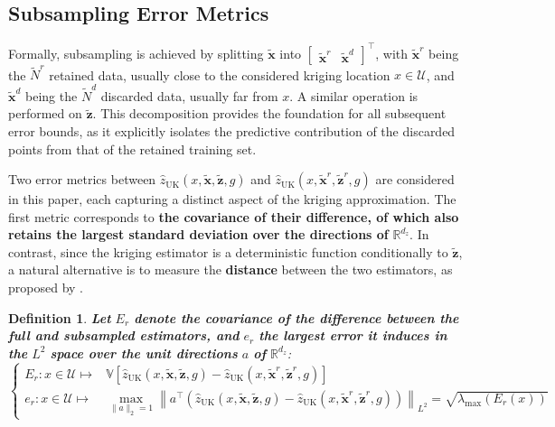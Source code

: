 \documentclass[preprint]{elsarticle}
\newtheorem{definition}{Definition}
\begin{document}
\subsection{Subsampling Error Metrics}\label{sec:subsampling_errors}

Formally, subsampling is achieved by splitting $\tilde{\mathbf{x}}$ into $\begin{bmatrix}\tilde{\mathbf{x}}^r&\tilde{\mathbf{x}}^d\end{bmatrix}^\top$, with $\tilde{\mathbf{x}}^r$ being the $\tilde{N}^r$ retained data, usually close to the considered kriging location $x\in\mathcal{U}$, and $\tilde{\mathbf{x}}^d$ being the $\tilde{N}^d$ discarded data, usually far from $x$. A similar operation is performed on $\tilde{\mathbf{z}}$. This decomposition provides the foundation for all subsequent error bounds, as it explicitly isolates the predictive contribution of the discarded points from that of the retained training set.

Two error metrics between $\hat{z}_{\mathrm{UK}}(x,\tilde{\mathbf{x}},\tilde{\mathbf{z}},g)$ and $\hat{z}_{\mathrm{UK}}(x,\tilde{\mathbf{x}}^r,\tilde{\mathbf{z}}^r,g)$ are considered in this paper, each capturing a distinct aspect of the kriging approximation. The first metric corresponds to \textbf{the covariance of their difference, of which  also retains the largest standard deviation over the directions of} $\mathbb{R}^{d_z}$. In contrast, since the kriging estimator is a deterministic function conditionally to $\tilde{\mathbf{z}}$, a natural alternative is to measure the \textbf{distance} between the two estimators, as proposed by .

\begin{definition}
    \textbf{Let} $E_r$ \textbf{denote the covariance of the difference between the full and subsampled estimators, and} $e_r$ \textbf{the largest error it induces in the} $L^2$ \textbf{space over the unit directions} $a$ \textbf{of} $\mathbb{R}^{d_z}$:
    \begin{equation*}
        \left\{\begin{aligned}
        E_r:x\in\mathcal{U}\mapsto&\mathbb{V}\left[\hat{z}_{\mathrm{UK}}(x,\tilde{\mathbf{x}},\tilde{\mathbf{z}},g)-\hat{z}_{\mathrm{UK}}(x,\tilde{\mathbf{x}}^r,\tilde{\mathbf{z}}^r,g)\right]\\
        e_r:x\in\mathcal{U}\mapsto&\underset{\|a\|_2=1}{\max}\left\|a^\top\left(\hat{z}_{\mathrm{UK}}(x,\tilde{\mathbf{x}},\tilde{\mathbf{z}},g)-\hat{z}_{\mathrm{UK}}(x,\tilde{\mathbf{x}}^r,\tilde{\mathbf{z}}^r,g)\right)\right\|_{L^2}=\sqrt{\lambda_{\max}\left(E_r(x)\right)}
        \end{aligned}\right.
    \end{equation*}\label{def:L2_error}
    \vspace{-\baselineskip}
\end{definition}
\end{document}
